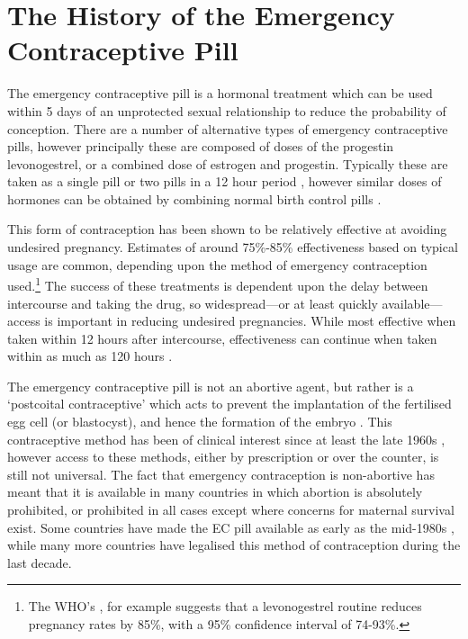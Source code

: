 \section{The History of the Emergency Contraceptive Pill}
\label{TEENscn:background}
The emergency contraceptive pill is a hormonal treatment which can be used 
within 5 days of an unprotected sexual relationship to reduce the probability
of conception.  There are a number of alternative types of emergency 
contraceptive pills, however principally these are composed of doses of the 
progestin levonogestrel, or a combined dose of estrogen and progestin. 
Typically these are taken as a single pill or two pills in a 12 hour period
\citep{vonHertzenetal2002}, however similar doses of hormones can be obtained 
by combining normal birth control pills \citep{Ellersonetal1998}.  

This form of contraception has been shown to be relatively effective at 
avoiding undesired pregnancy.  Estimates of around 75\%-85\% effectiveness 
based on typical usage are common, depending upon the method of emergency 
contraception used.\footnote{The WHO's \citet{WHO1998}, for example suggests 
that a levonogestrel routine reduces pregnancy rates by 85\%, with a 95\% 
confidence interval of 74-93\%.}  The success of these treatments is dependent
upon the delay between intercourse and taking the drug, so widespread---or at 
least quickly available---access is important in reducing undesired 
pregnancies.  While most effective when taken within 12 hours after 
intercourse, effectiveness can continue when taken within as much as 120 hours
\citep{vonHertzenetal2002}.

The emergency contraceptive pill is not an abortive agent, but rather is a 
`postcoital contraceptive' which acts to prevent the implantation of the 
fertilised egg cell (or blastocyst), and hence the formation of the embryo 
\citep{Morris1973}.  This contraceptive method has been of clinical interest
since at least the late 1960s \citep{Demers1971}, however access to these 
methods, either by prescription or over the counter, is still not universal.
The fact that emergency contraception is non-abortive has meant that it is
available in many countries in which abortion is absolutely prohibited, or
prohibited in all cases except where concerns for maternal survival exist.
Some countries have made the EC pill available as early as the mid-1980s 
\citep{UKFPA2006}, while many more countries have legalised this method of 
contraception during the last decade.


